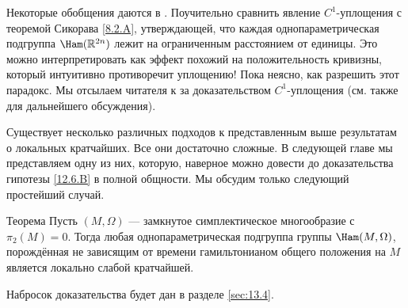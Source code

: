 Некоторые обобщения даются в \cite{LM2}.
Поучительно сравнить явление $C^1$-уплощения с теоремой Сикорава \ref{8.2.A}, утверждающей, что каждая однопараметрическая подгруппа $\Ham(\RR^{2n})$ лежит на ограниченным расстоянием от единицы. 
Это можно интерпретировать как эффект похожий на положительность кривизны, который интуитивно противоречит уплощению! 
Пока неясно, как разрешить этот парадокс.
Мы отсылаем читателя к \cite{BP1,HZ} за доказательством $C^1$-уплощения (см. также \cite{P8} для дальнейшего обсуждения). 

Существует несколько различных подходов к представленным выше результатам о локальных кратчайших. 
Все они достаточно сложные.
В следующей главе мы представляем одну из них, которую, наверное можно довести до доказательства гипотезы \ref{12.6.B} в полной общности. 
Мы обсудим только следующий простейший случай.

\begin{thm}{Теорема}\label{12.6.F}
Пусть $(M, \Omega)$ — замкнутое симплектическое многообразие с $\pi_2(M) = 0$.
Тогда любая однопараметрическая подгруппа группы $\Ham(M, \Omega)$, порождённая не зависящим от времени гамильтонианом общего положения на $M$ является локально слабой кратчайшей. 
\end{thm}

Набросок доказательства будет дан в разделе \ref{sec:13.4}.
